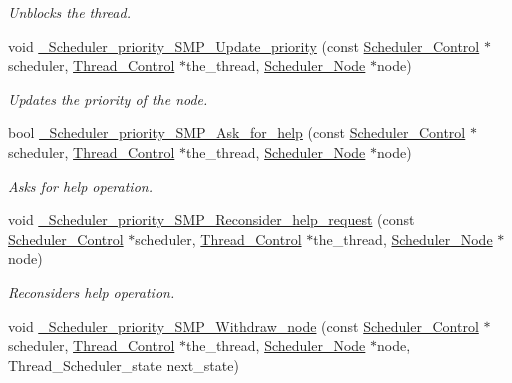 \begin{DoxyCompactItemize}
\begin{DoxyCompactList}\small\item\em Unblocks the thread. \end{DoxyCompactList}\item 
void \mbox{\hyperlink{group__RTEMSScoreSchedulerPrioritySMP_gaa0b27f664118ba826a57d96f60dc2e69}{\+\_\+\+Scheduler\+\_\+priority\+\_\+\+S\+M\+P\+\_\+\+Update\+\_\+priority}} (const \mbox{\hyperlink{struct__Scheduler__Control}{Scheduler\+\_\+\+Control}} $\ast$scheduler, \mbox{\hyperlink{struct__Thread__Control}{Thread\+\_\+\+Control}} $\ast$the\+\_\+thread, \mbox{\hyperlink{structScheduler__Node}{Scheduler\+\_\+\+Node}} $\ast$node)
\begin{DoxyCompactList}\small\item\em Updates the priority of the node. \end{DoxyCompactList}\item 
bool \mbox{\hyperlink{group__RTEMSScoreSchedulerPrioritySMP_gaf6e820955e376f3cf4ec6ac370baf33b}{\+\_\+\+Scheduler\+\_\+priority\+\_\+\+S\+M\+P\+\_\+\+Ask\+\_\+for\+\_\+help}} (const \mbox{\hyperlink{struct__Scheduler__Control}{Scheduler\+\_\+\+Control}} $\ast$scheduler, \mbox{\hyperlink{struct__Thread__Control}{Thread\+\_\+\+Control}} $\ast$the\+\_\+thread, \mbox{\hyperlink{structScheduler__Node}{Scheduler\+\_\+\+Node}} $\ast$node)
\begin{DoxyCompactList}\small\item\em Asks for help operation. \end{DoxyCompactList}\item 
void \mbox{\hyperlink{group__RTEMSScoreSchedulerPrioritySMP_gaa5708b801e5a3ee7e2989e4ea820bb5b}{\+\_\+\+Scheduler\+\_\+priority\+\_\+\+S\+M\+P\+\_\+\+Reconsider\+\_\+help\+\_\+request}} (const \mbox{\hyperlink{struct__Scheduler__Control}{Scheduler\+\_\+\+Control}} $\ast$scheduler, \mbox{\hyperlink{struct__Thread__Control}{Thread\+\_\+\+Control}} $\ast$the\+\_\+thread, \mbox{\hyperlink{structScheduler__Node}{Scheduler\+\_\+\+Node}} $\ast$node)
\begin{DoxyCompactList}\small\item\em Reconsiders help operation. \end{DoxyCompactList}\item 
void \mbox{\hyperlink{group__RTEMSScoreSchedulerPrioritySMP_ga7b4de88a42ea0ed0cf175be9a9babd13}{\+\_\+\+Scheduler\+\_\+priority\+\_\+\+S\+M\+P\+\_\+\+Withdraw\+\_\+node}} (const \mbox{\hyperlink{struct__Scheduler__Control}{Scheduler\+\_\+\+Control}} $\ast$scheduler, \mbox{\hyperlink{struct__Thread__Control}{Thread\+\_\+\+Control}} $\ast$the\+\_\+thread, \mbox{\hyperlink{structScheduler__Node}{Scheduler\+\_\+\+Node}} $\ast$node, Thread\+\_\+\+Scheduler\+\_\+state next\+\_\+state)

\end{DoxyCompactItemize}
